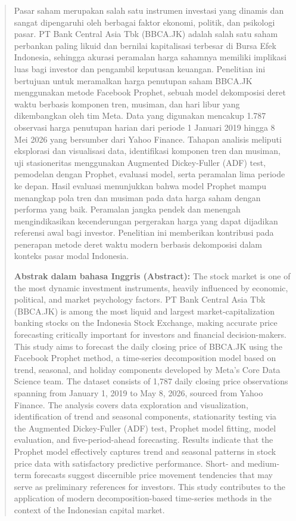 \documentclass[11pt,twoside]{article}
\author{
\begin{minipage}{\textwidth}
\authorone,
\authortwo,
\authorthree,
\authorfour
\\[1em]
$^1$ \affilone\\
\corrauthor
\end{minipage}
}
\begin{document}
\maketitle

\begin{abstract}

Pasar saham merupakan salah satu instrumen investasi yang dinamis dan sangat dipengaruhi oleh
berbagai faktor ekonomi, politik, dan psikologi pasar. PT Bank Central Asia Tbk (BBCA.JK) adalah
salah satu saham perbankan paling likuid dan bernilai kapitalisasi terbesar di Bursa Efek Indonesia,
sehingga akurasi peramalan harga sahamnya memiliki implikasi luas bagi investor dan pengambil
keputusan keuangan. Penelitian ini bertujuan untuk meramalkan harga penutupan saham BBCA.JK
menggunakan metode Facebook Prophet, sebuah model dekomposisi deret waktu berbasis komponen
tren, musiman, dan hari libur yang dikembangkan oleh tim Meta. Data yang digunakan mencakup
1.787 observasi harga penutupan harian dari periode 1 Januari 2019 hingga 8 Mei 2026 yang
bersumber dari Yahoo Finance. Tahapan analisis meliputi eksplorasi dan visualisasi data, identifikasi
komponen tren dan musiman, uji stasioneritas menggunakan Augmented Dickey-Fuller (ADF) test,
pemodelan dengan Prophet, evaluasi model, serta peramalan lima periode ke depan. Hasil evaluasi
menunjukkan bahwa model Prophet mampu menangkap pola tren dan musiman pada data harga saham
dengan performa yang baik. Peramalan jangka pendek dan menengah mengindikasikan kecenderungan
pergerakan harga yang dapat dijadikan referensi awal bagi investor. Penelitian ini memberikan
kontribusi pada penerapan metode deret waktu modern berbasis dekomposisi dalam konteks pasar modal
Indonesia.

\textbf{Abstrak dalam bahasa Inggris (Abstract):}
The stock market is one of the most dynamic investment instruments, heavily influenced by economic,
political, and market psychology factors. PT Bank Central Asia Tbk (BBCA.JK) is among the most
liquid and largest market-capitalization banking stocks on the Indonesia Stock Exchange, making
accurate price forecasting critically important for investors and financial decision-makers. This study
aims to forecast the daily closing price of BBCA.JK using the Facebook Prophet method, a
time-series decomposition model based on trend, seasonal, and holiday components developed by
Meta's Core Data Science team. The dataset consists of 1,787 daily closing price observations
spanning from January 1, 2019 to May 8, 2026, sourced from Yahoo Finance. The analysis covers
data exploration and visualization, identification of trend and seasonal components, stationarity
testing via the Augmented Dickey-Fuller (ADF) test, Prophet model fitting, model evaluation, and
five-period-ahead forecasting. Results indicate that the Prophet model effectively captures trend and
seasonal patterns in stock price data with satisfactory predictive performance. Short- and
medium-term forecasts suggest discernible price movement tendencies that may serve as preliminary
references for investors. This study contributes to the application of modern decomposition-based
time-series methods in the context of the Indonesian capital market.


\end{abstract}
\end{document}
